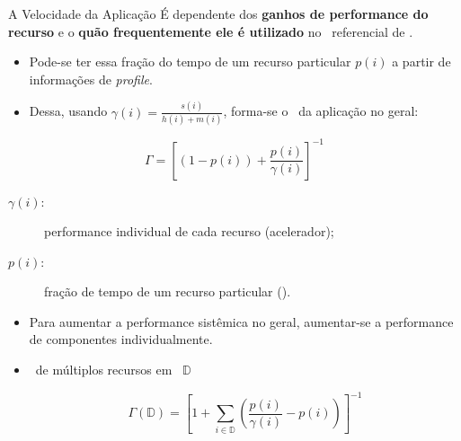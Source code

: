    \begin{frame}
      \begin{block}{A Velocidade da Aplicação}
         É dependente dos \textbf{ganhos de performance do recurso} e o \textbf{quão frequentemente ele é utilizado} no \design\ referencial de \software.
      \end{block}
   
      \begin{itemize}
         \item Pode-se ter essa fração do tempo de um recurso particular $ p(i) $ a partir de informações de \textit{profile}.
         
         \item Dessa, usando $\gamma(i) = \frac{s(i)}{h(i) + m(i)}$, forma-se o \speedup\ da aplicação no geral:
      \end{itemize}
   
      \begin{equation}
         \Gamma = \left [
         (1 - p(i))
         +
         \frac{
            p(i)
         }{
            \gamma(i)
         } \right ]^{-1}
      \end{equation}
      
      \begin{description}
         \item [$\gamma(i)$:] performance individual de cada recurso (acelerador);
         \item [$p(i)$:] fração de tempo de um recurso particular (\software).
      \end{description}
      
   
   \end{frame}

   \begin{frame}
      \begin{itemize}
         \item Para aumentar a performance sistêmica no geral, aumentar-se a performance de componentes individualmente.
         
         \item \Speedup\ de múltiplos recursos em \hardware\ $ \mathbb{D} $
         
         \begin{equation}
            \Gamma (\mathbb{D}) =
            \left [
            1 + \sum _{i \in \mathbb{D}} \left (
            \frac{
               p(i)
            }{
               \gamma(i)
            }-p(i)
            \right)
            \right ]^{-1} \label{eq:d_final}
         \end{equation}
         
      \end{itemize}
   \end{frame}
   
